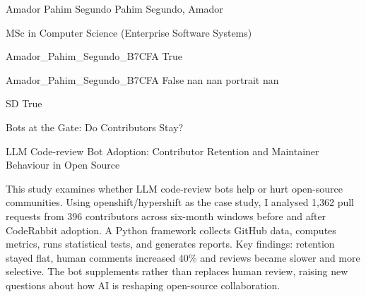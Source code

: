 \documentclass[twoside]{report}
\begin{document}
\begingroup{}\relax



\def\Key{Amador_Pahim_Segundo_B7CFA}

{Amador Pahim Segundo}
{Pahim Segundo, Amador}

{MSc in Computer Science (Enterprise Software Systems)}

{Amador_Pahim_Segundo_B7CFA}
{True}

{Amador_Pahim_Segundo_B7CFA}
{False}
{nan}
{nan}
{portrait}
{nan}

{SD}
{True}

{Bots at the Gate: Do Contributors Stay?}

{LLM Code-review Bot Adoption: Contributor Retention and Maintainer Behaviour in Open Source}

{This study examines whether LLM code-review bots help or hurt open-source communities. Using openshift/hypershift as the case study, I analysed 1,362 pull requests from 396 contributors across six-month windows before and after CodeRabbit adoption. A Python framework collects GitHub data, computes metrics, runs statistical tests, and generates reports. Key findings: retention stayed flat, human comments increased 40\% and reviews became slower and more selective. The bot supplements rather than replaces human review, raising new questions about how AI is reshaping open-source collaboration.}
\end{document}
